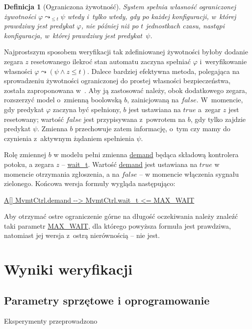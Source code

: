\documentclass{pracamgr}
\newcommand{\ttt}[1]{\url{#1}}
\newcommand{\tttform}[1]{
  \begin{center}
    \ttt{#1}
  \end{center}
}
\theoremstyle{plain}
\newtheorem{definition}{Definicja}
\begin{document}
\begin{definition}[Ograniczona żywotność]
  System spełnia własność ograniczonej żywotności $\varphi
  \leadsto_{\leq t} \psi $ wtedy i~tylko wtedy, gdy po każdej
  konfiguracji, w~której prawdziwy jest predykat $\varphi$, nie
  później niż po $t$ jednostkach czasu, nastąpi konfiguracja, w~której
  prawdziwy jest predykat~$\psi$.
\end{definition}
Najprostszym sposobem weryfikacji tak zdefiniowanej żywotności byłoby
dodanie zegara $z$ resetowanego ilekroć stan automatu zaczyna
spełniać $\varphi$ i~weryfikowanie własności \mbox{$\varphi \leadsto
  (\psi \land z\leq t)$}. Dalece bardziej efektywna metoda, polegająca
na sprowadzeniu żywotności ograniczonej do prostej własności
bezpieczeństwa, została zaproponowana w~\cite{lpw:tacas98}. Aby ją
zastosować należy, obok dodatkowego zegara, rozszerzyć model o~zmienną
boolowską $b$, zainicjowaną na $false$.  W~momencie, gdy predykat
$\varphi$ zaczyna być spełniony, $b$ jest ustawiana na $true$ a~zegar
$z$ jest resetowany; wartość $false$ jest przypisywana z~powrotem na
$b$, gdy tylko zajdzie predykat $\psi$. Zmienna $b$ przechowuje zatem
informację, o~tym czy mamy do czynienia z~aktywnym żądaniem spełnienia
$\psi$.

Rolę zmiennej $b$ w modelu pełni zmienna \ttt{demand} będąca składową
kontrolera potoku, a zegara $z$ -- \ttt{wait_t}. Wartość \ttt{demand}
jest ustawiana na $true$ w momencie otrzymania zgłoszenia, a na
$false$ -- w momencie włączenia sygnału zielonego. Końcowa wersja
formuły wygląda następująco:
\tttform{A[] MvmtCtrl.demand --> MvmtCtrl.wait_t <= MAX_WAIT}
Aby otrzymać ostre ograniczenie górne na długość oczekiwania należy
znaleźć taki parametr \ttt{MAX_WAIT}, dla którego powyższa formuła
jest prawdziwa, natomiast jej wersja z~ostrą nierównością -- nie jest.

\section{Wyniki weryfikacji}
\label{s:ver:results}
\subsection{Parametry sprzętowe i oprogramowanie}
Eksperymenty przeprowadzono
\end{document}
